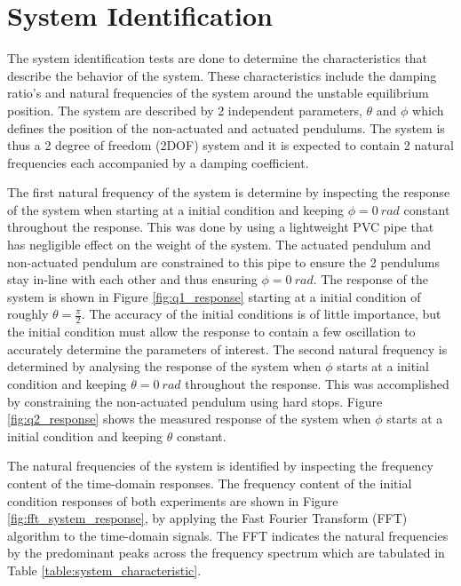 \section{System Identification}

The system identification tests are done to determine the characteristics that describe the behavior of the system. These characteristics include the damping ratio's and natural frequencies of the system around the unstable equilibrium position. The system are described by 2 independent parameters, $\theta$ and $\phi$ which defines the position of the non-actuated and actuated pendulums. The system is thus a 2 degree of freedom (2DOF) system and it is expected to contain 2 natural frequencies each accompanied by a damping coefficient.

The first natural frequency of the system is determine by inspecting the response of the system when starting at a initial condition and keeping $\phi = \SI{0}{rad}$ constant throughout the response. This was done by using a lightweight PVC pipe that has negligible effect on the weight of the system. The actuated pendulum and non-actuated pendulum are constrained to this pipe to ensure the 2 pendulums stay in-line with each other and thus ensuring $\phi = \SI{0}{rad}$. The response of the system is shown in Figure \ref{fig:q1_response} starting at a initial condition of roughly $\theta = \frac{\pi}{2}$. The accuracy of the initial conditions is of little importance, but the initial condition must allow the response to contain a few oscillation to accurately determine the parameters of interest. The second natural frequency is determined by analysing the response of the system when $\phi$ starts at a initial condition and keeping $\theta = \SI{0}{rad}$ throughout the response. This was accomplished by constraining the non-actuated pendulum using hard stops. Figure \ref{fig:q2_response} shows the measured response of the system when $\phi$ starts at a initial condition and keeping $\theta$ constant.%

The natural frequencies of the system is identified by inspecting the frequency content of the time-domain responses. The frequency content of the initial condition responses of both experiments are shown in Figure \ref{fig:fft_system_response}, by applying the Fast Fourier Transform (FFT) algorithm to the time-domain signals. The FFT indicates the natural frequencies by the predominant peaks across the frequency spectrum which are tabulated in Table \ref{table:system_characteristic}.

